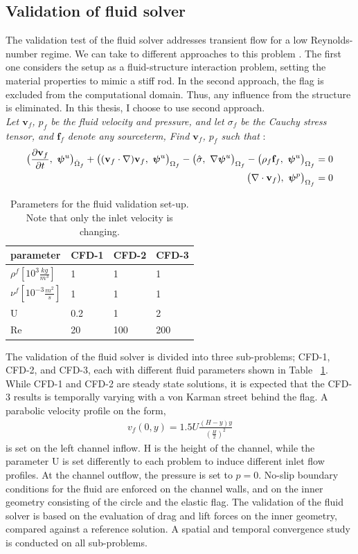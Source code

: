 \subsection{Validation of fluid solver}
The validation test of the fluid solver addresses transient flow for a low Reynolds-number regime. We can take to different approaches to this problem \cite{Hron2006}. The first one considers the setup as a fluid-structure interaction problem, setting the material properties to mimic a stiff rod. In the second approach, the flag is excluded from the computational domain. Thus, any influence from the structure is eliminated. In this thesis, I choose to use second approach.  \\
\textit{Let $\mathbf{v}_f$, ${p}_f$ be the fluid velocity and pressure, and let  $\sigma_f$ be the Cauchy stress tensor, and $\mathbf{f}_f$ denote any sourceterm,  Find $\mathbf{v}_f$, ${p}_f$ such that }:
\begin{align*}
 \big( \frac{\partial \mathbf{v}_f}{\partial t}, \ \bm{\psi}^u \big)_{\hat{\Omega}_f} +
\big((\mathbf{v}_f \cdot \nabla) \mathbf{v}_f, \ {\bm{\psi}^u} \big)_{\Omega_f}
- \big(\hat{\sigma}, \ {\nabla\bm{\psi}^u} \big)_{\Omega_f} -
\big(\rho_f  \mathbf{f}_f, \ {{\bm{\psi}^u}} \big)_{\Omega_f} = 0 \\
\big(\nabla \cdot \mathbf{v}_f), \ {\bm{\psi}^p} \big)_{\Omega_f} = 0 
\end{align*} 
\begin{table}[h!]
\centering
\begin{tabular}{ |p{3cm}||p{2cm}|p{2cm}|p{2cm}|  }
\hline
 parameter              & CFD-1 & CFD-2 & CFD-3 \\
 \hline
$\rho^f [10^{3}\frac{kg}{m^3}]$ & 1    & 1    & 1    \\
$\nu^f  [10^{-3}\frac{m^2}{s}]$  & 1    & 1    & 1    \\
U                      & 0.2  & 1    & 2    \\
Re                     & 20   & 100  & 200 \\
\hline
\end{tabular}
\caption{Parameters for the fluid validation set-up. Note that only the inlet velocity is changing.}
\label{sec:cfdparam}
\end{table}
The validation of the fluid solver is divided into three sub-problems; CFD-1, CFD-2, and CFD-3, each with different fluid parameters shown in Table ~\ref{sec:cfdparam}. While CFD-1 and CFD-2 are steady state solutions, it is expected that the CFD-3 results is temporally varying with a von Karman street behind the flag. A parabolic velocity profile on the form,
\begin{align*}
v_f(0, y) = 1.5 U\frac{(H -y)y}{(\frac{H}{2})^2}
\end{align*}
is set on the left channel inflow. H is the height of the channel, while the parameter U is set differently to each problem to induce different inlet flow profiles. At the channel outflow, the pressure is set to $p = 0$. No-slip boundary conditions for the fluid are enforced on the channel walls, and on the inner geometry consisting of the circle and the elastic flag. The validation of the fluid solver is based on the evaluation of drag and lift forces on the inner geometry, compared against a reference solution. A spatial and temporal convergence study is conducted on all sub-problems. 
\newpage
